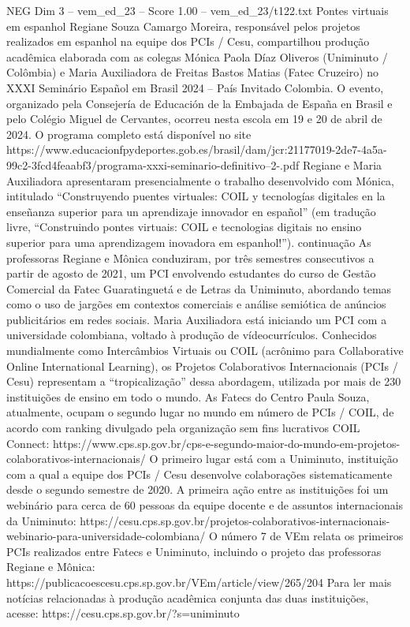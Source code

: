 \begin{textsample}{NEG Dim 3 – vem\_ed\_23 – Score 1.00 – vem\_ed\_23/t122.txt}  \label{ex:f3_neg_068}
Pontes virtuais em espanhol Regiane Souza Camargo Moreira, responsável pelos projetos realizados em espanhol na equipe dos PCIs / Cesu, compartilhou produção acadêmica elaborada com as colegas Mónica Paola Díaz Oliveros (Uniminuto / Colômbia) e Maria Auxiliadora de Freitas Bastos Matias (Fatec Cruzeiro) no XXXI Seminário Español em Brasil 2024 – País Invitado Colombia.
O evento, organizado pela Consejería de Educación de la Embajada de España en Brasil e pelo Colégio Miguel de Cervantes, ocorreu nesta escola em 19 e 20 de abril de 2024.
O programa completo está disponível no site https://www.educacionfpydeportes.gob.es/brasil/dam/jcr:21177019-2de7-4a5a-99c2-3fcd4feaabf3/programa-xxxi-seminario-definitivo--2-.pdf Regiane e Maria Auxiliadora apresentaram presencialmente o trabalho desenvolvido com Mónica, intitulado “Construyendo puentes virtuales: COIL y tecnologías digitales en la enseñanza superior para un aprendizaje innovador en español” (em tradução livre, “Construindo pontes virtuais: COIL e tecnologias digitais no ensino superior para uma aprendizagem inovadora em espanhol!”). continuação As professoras Regiane e Mônica conduziram, por três semestres consecutivos a partir de agosto de 2021, um PCI envolvendo estudantes do curso de Gestão Comercial da Fatec Guaratinguetá e de Letras da Uniminuto, abordando temas como o uso de jargões em contextos comerciais e análise semiótica de anúncios publicitários em redes sociais.
Maria Auxiliadora está iniciando um PCI com a universidade colombiana, voltado à produção de vídeocurrículos.
Conhecidos mundialmente como Intercâmbios Virtuais ou COIL (acrônimo para Collaborative Online International Learning), os Projetos Colaborativos Internacionais (PCIs / Cesu) representam a “tropicalização” dessa abordagem, utilizada por mais de 230 instituições de ensino em todo o mundo.
As Fatecs do Centro Paula Souza, atualmente, ocupam o segundo lugar no mundo em número de PCIs / COIL, de acordo com ranking divulgado pela organização sem fins lucrativos COIL Connect: https://www.cps.sp.gov.br/cps-e-segundo-maior-do-mundo-em-projetos-colaborativos-internacionais/ O primeiro lugar está com a Uniminuto, instituição com a qual a equipe dos PCIs / Cesu desenvolve colaborações sistematicamente desde o segundo semestre de 2020.
A primeira ação entre as instituições foi um webinário para cerca de 60 pessoas da equipe docente e de assuntos internacionais da Uniminuto: https://cesu.cps.sp.gov.br/projetos-colaborativos-internacionais-webinario-para-universidade-colombiana/ O número 7 de VEm relata os primeiros PCIs realizados entre Fatecs e Uniminuto, incluindo o projeto das professoras Regiane e Mônica: https://publicacoescesu.cps.sp.gov.br/VEm/article/view/265/204 Para ler mais notícias relacionadas à produção acadêmica conjunta das duas instituições, acesse: https://cesu.cps.sp.gov.br/?s=uniminuto

\end{textsample}

